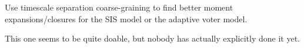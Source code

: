 Use timescale separation coarse-graining to find better moment expansions/closures for the SIS model or the adaptive voter model. 

\solution
This one seems to be quite doable, but nobody has actually explicitly done it yet.
